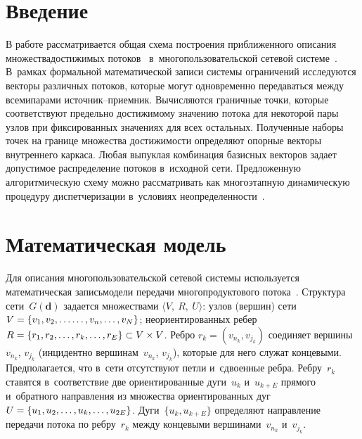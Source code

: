 \begin{multicols}{2}

\label{st\stat}

\section{Введение}

В работе рассматривается общая схема по\-строения 
приближенного описания множества\linebreak достижимых потоков~\cite{lot} 
в~многопользовательской сетевой системе~\cite{Yen, Dan}. В~рамках 
формальной математической записи системы ограничений ис\-следуются 
векторы различных потоков, которые могут одновременно передаваться 
между всеми\linebreak парами ис\-точ\-ник--при\-ем\-ник. Вычисляются граничные точки,
 которые соответствуют предельно достижимому значению потока для некоторой 
 пары узлов при фиксированных значениях для всех остальных. 
 Полученные наборы точек на грани\-це множества достижимости определяют
  опорные векторы      внутреннего каркаса. Любая вы\-пук\-лая комбинация 
  базисных векторов задает до\-пус\-ти\-мое распределение потоков в~исходной сети. 
  Предло\-жен\-ную алгоритмическую схему можно рас\-сматри\-вать как 
  многоэтапную динамическую процедуру диспетчеризации в~условиях 
  не\-опре\-де\-лен\-ности~\cite{JCM-19, Mal19-6}. 
  
  \vspace*{-6pt}

\section{Математическая модель}

  \vspace*{-2pt}

Для описания многопользовательской сетевой системы  используется 
математическая запись\linebreak модели передачи многопродуктового потока~\cite{Mal19-6}.
Структура сети~$G(\mathbf{d})$ задается множествами  
$\langle V,\ R, \ U\rangle$:
узлов (вершин) сети  $V \hm= \{ v_1, v_2, \ldots\linebreak
\ldots, v_n, \ldots, v_N \}$;
неориентированных ребер $R \hm= \{ r_1, r_2, \ldots, r_k, \ldots, r_E \} 
\hm\subset V \times V$.  Ребро $r_k = (v_{n_k}, v_{j_k})$ 
соединяет вершины~$v_{n_k}$, $v_{j_k}$ (инцидентно вершинам~$v_{n_k}$, 
$v_{j_k}$), которые для него служат концевыми. Предполагается, что 
в~сети отсутствуют петли и~сдвоенные ребра.
Ребру~$r_k$ ставятся в~соответствие две ориентированные дуги~$u_k$ и~$u_{k+E}$ 
прямого и~обратного направления из множества
ориентированных дуг  $U \hm= \{ u_1, u_2,\ldots, u_k, \ldots, u_{2E}\}$.
Дуги~$\{u_k, u_{k+E}\}$ определяют направление передачи потока по  
ребру~$r_k$ между концевыми вершинами~$v_{n_k}$ и~$v_{j_k}$.


\end{multicols}
